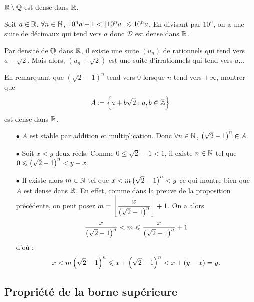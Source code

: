 \documentclass{magnolia}
\begin{document}
  \begin{remarqueUnique}
  \remarque $\mathbb{R}\setminus\mathbb{Q}$ est dense dans $\mathbb{R}$.
  \begin{sol}
  Soit $a\in \mathbb{R}$. $\forall n \in \mathbb{N}$, $10^n a-1 < \left\lfloor10^n a\right\rfloor\leqslant 10^n a$. En divisant par $10^n$, on a une suite de décimaux qui tend vers $a$ donc $\mathcal{D}$ est dense dans $\mathbb{R}$.
  
  Par densité de $\mathbb{Q}$ dans $\mathbb{R}$, il existe une suite $(u_n)$ de rationnels qui tend vers $a-\sqrt{2}$. Mais alors, $(u_n+\sqrt{2})$ est une suite d'irrationnels qui tend vers $a$...
  \end{sol}
  \end{remarqueUnique}
  
  \begin{exoUnique}
  \exo En remarquant que $(\sqrt{2}-1)^n$ tend vers 0 lorsque $n$ tend vers
    $+\infty$, montrer que
    \[A\coloneqq\left\{a+b\sqrt{2} : a,b\in\mathbb{Z}\right\}\]
    est dense dans $\mathbb{R}$.
    
  \begin{sol}
  \begin{itemize}
  \item[$\bullet$] $A$ est stable par addition et multiplication. Donc $\forall n \in \mathbb{N}$, $\left(\sqrt{2}-1\right)^n \in A$.
  \item[$\bullet$] Soit $x<y$ deux réels. Comme $0\leq \sqrt{2}-1<1$, il existe $n\in \mathbb{N}$ tel que $0\leqslant \left(\sqrt{2}-1\right)^n < y-x$.
  \item[$\bullet$] Il existe alors $m\in \mathbb{N}$ tel que $x<m\left(\sqrt{2}-1\right)^n <y$ ce qui montre bien que $A$ est dense dans $\mathbb{R}$. En effet, comme dans la preuve de la proposition précédente, on peut poser $m=\displaystyle \left\lfloor\frac{x}{\left(\sqrt{2}-1\right)^n}\right\rfloor+1$. On a alors $$\frac{x}{\left(\sqrt{2}-1\right)^n}<m \leqslant \frac{x}{\left(\sqrt{2}-1\right)^n}+1$$ d'où :$$x<m\left(\sqrt{2}-1\right)^n \leqslant x+\left(\sqrt{2}-1\right)^n <x+(y-x)=y.$$
  
  \end{itemize}
  \end{sol}
  \end{exoUnique}

\subsection{Propriété de la borne supérieure}
\end{document}
